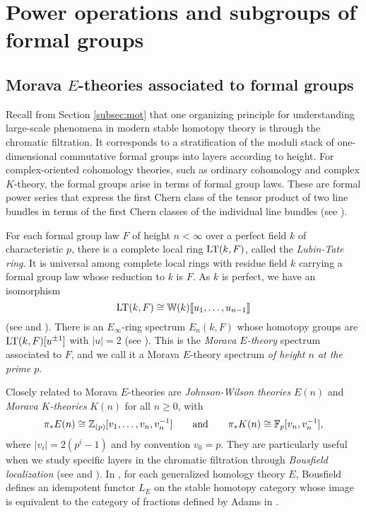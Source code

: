 \documentclass{gtpart}
\theoremstyle{definition}
\theoremstyle{remark}
\newcommand{\mb}[1]{\mathbb{#1}}
\newcommand{\LT}{{\rm LT}}
\newcommand{\BF}{{\mb F}}
\newcommand{\BW}{{\mb W}}
\newcommand{\BZ}{{\mb Z}}
\newcommand{\ad}{{\rm and}}
\numberwithin{equation}{section}
\numberwithin{thm}{section}
\begin{document}
\section{Power operations and subgroups of formal groups}
\label{sec:fg}

\subsection{Morava $E$-theories associated to formal groups}
\label{subsec:E}

Recall from Section \ref{subsec:mot} that one organizing principle for 
understanding large-scale phenomena in modern stable homotopy theory is 
through the chromatic filtration.  It corresponds to a stratification of 
the moduli stack of one-dimensional commutative formal groups into 
layers according to height.  For complex-oriented cohomology theories, 
such as ordinary cohomology and complex $K$-theory, the formal groups 
arise in terms of formal group laws.  These are formal power series that 
express the first Chern class of the tensor product of two line bundles 
in terms of the first Chern classes of the individual line bundles (see 
\cite[Section 1]{coctalos}).  

For each formal group law $F$ of height $n<\infty$ over a perfect field 
$k$ of characteristic $p$, there is a complete local ring $\LT(k,F)$, 
called the {\em Lubin-Tate ring}.  It is universal among complete local 
rings with residue field $k$ carrying a formal group law whose reduction 
to $k$ is $F$.  As $k$ is perfect, we have an isomorphism 
\[
 \LT(k,F) \cong \BW(k) \llbracket u_1,\ldots,u_{n-1} \rrbracket 
\]
(see \cite{lubintate} and \cite[Sections 4.3 and 4.5]{Rnotes}).  There 
is an $E_\infty$-ring spectrum $E_n(k,F)$ whose homotopy groups are 
$\LT(k,F)[u^{\pm1}]$ with $|u| = 2$ (see 
\cite[Corollary 7.6]{goersshopkins}).  This is the {\em Morava 
$E$-theory} spectrum associated to $F$, and we call it a Morava 
$E$-theory spectrum {\em of height $n$ at the prime $p$}.  

Closely related to Morava $E$-theories are {\em Johnson-Wilson theories} 
$E(n)$ and {\em Morava $K$-theories} $K(n)$ for all $n \geq 0$, with 
\[
 \pi_*E(n) \cong \BZ_{(p)}[v_1,\ldots,v_n,v_n^{-1}] \qquad \ad \qquad 
 \pi_*K(n) \cong \BF_p[v_n,v_n^{-1}], 
\]
where $|v_i| = 2(p^i-1)$ and by convention $v_0 = p$.  They are 
particularly useful when we study specific layers in the chromatic 
filtration through {\em Bousfield localization} (see 
\cite[Chapter 7]{orange} and \cite[Lectures 20-23]{252x}).  In 
\cite{bousfield}, for each generalized homology theory $E$, Bousfield 
defines an idempotent functor $L_E$ on the stable homotopy category 
whose image is equivalent to the category of fractions defined by Adams 
in \cite[Section III.14]{sh}.  
\end{document}
